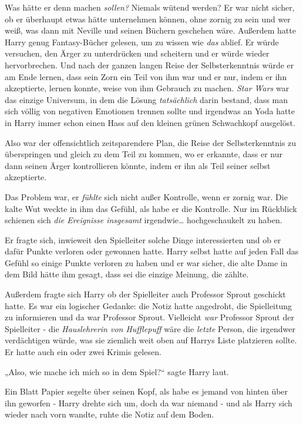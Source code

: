 {Was hätte er denn machen \emph{sollen?} Niemals wütend werden? Er war nicht sicher, ob er überhaupt etwas hätte unternehmen können, ohne zornig zu sein und wer weiß, was dann mit Neville und seinen Büchern geschehen wäre. Außerdem hatte Harry genug Fantasy-Bücher gelesen, um zu wissen wie \emph{das} ablief. Er würde versuchen, den Ärger zu unterdrücken und scheitern und er würde wieder hervorbrechen. Und nach der ganzen langen Reise der Selbsterkenntnis würde er am Ende lernen, dass sein Zorn ein Teil von ihm war und er nur, indem er ihn akzeptierte, lernen konnte, weise von ihm Gebrauch zu machen. \emph{Star Wars} war das einzige Universum, in dem die Lösung \emph{tatsächlich} darin bestand, dass man sich völlig von negativen Emotionen trennen sollte und irgendwas an Yoda hatte in Harry immer schon einen Hass auf den kleinen grünen Schwachkopf ausgelöst.

Also war der offensichtlich zeitsparendere Plan, die Reise der Selbsterkenntnis zu überspringen und gleich zu dem Teil zu kommen, wo er erkannte, dass er nur dann seinen Ärger kontrollieren könnte, indem er ihn als Teil seiner selbst akzeptierte.

Das Problem war, er \emph{fühlte} sich nicht außer Kontrolle, wenn er zornig war. Die kalte Wut weckte in ihm das Gefühl, als habe er die Kontrolle. Nur im Rückblick schienen sich \emph{die Ereignisse insgesamt} irgendwie… hochgeschaukelt zu haben.

Er fragte sich, inwieweit den Spielleiter solche Dinge interessierten und ob er dafür Punkte verloren oder gewonnen hatte. Harry selbst hatte auf jeden Fall das Gefühl so einige Punkte verloren zu haben und er war sicher, die alte Dame in dem Bild hätte ihm gesagt, dass sei die einzige Meinung, die zählte.

Außerdem fragte sich Harry ob der Spielleiter auch Professor Sprout geschickt hatte. Es war ein logischer Gedanke: die Notiz hatte angedroht, die Spielleitung zu informieren und da war Professor Sprout. Vielleicht \emph{war} Professor Sprout der Spielleiter - die \emph{Hauslehrerin von Hufflepuff} wäre die \emph{letzte} Person, die irgendwer verdächtigen würde, was sie ziemlich weit oben auf Harrys Liste platzieren sollte. Er hatte auch ein oder zwei Krimis gelesen.

„Also, wie mache ich mich so in dem Spiel?“ sagte Harry laut.

Ein Blatt Papier segelte über seinen Kopf, als habe es jemand von hinten über ihn geworfen - Harry drehte sich um, doch da war niemand - und als Harry sich wieder nach vorn wandte, ruhte die Notiz auf dem Boden.

}
